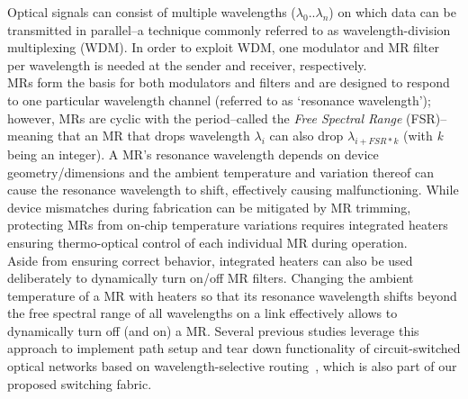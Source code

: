 Optical signals can consist of multiple wavelengths ($\lambda _0 .. \lambda_n$) on which data can be transmitted in parallel--a technique commonly referred to as wavelength-division multiplexing (WDM). In order to exploit WDM, one modulator and MR filter per wavelength is needed at the sender and receiver, respectively. \\
MRs form the basis for both modulators and filters and are designed to respond to one particular wavelength channel (referred to as `resonance wavelength'); however, MRs are cyclic with the period--called the \textit{Free Spectral Range} (FSR)--meaning that an MR that drops wavelength $\lambda_i$ can also drop $\lambda_{i+ FSR*k}$ (with \textit{k} being an integer). A MR's resonance wavelength depends on device geometry/dimensions and the ambient temperature and variation thereof can cause the resonance wavelength to shift, effectively causing malfunctioning. While device mismatches during fabrication can be mitigated by MR trimming, protecting MRs from on-chip temperature variations requires integrated heaters ensuring thermo-optical control of each individual MR during operation. \\
Aside from ensuring correct behavior, integrated heaters can also be used deliberately to dynamically turn on/off MR filters. Changing the ambient temperature of a MR with heaters so that its resonance wavelength shifts beyond the free spectral range of all wavelengths on a link effectively allows to dynamically turn off (and on) a MR. Several previous studies leverage this approach to implement path setup and tear down functionality of circuit-switched optical networks based on wavelength-selective routing~\cite{bergman2014photonic}, which is also part of our proposed switching fabric. 

